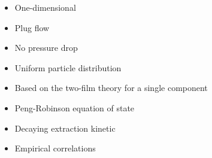 \documentclass[a0,portrait]{a0poster}
\begin{document}
\begin{multicols}{2}
\begin{tcolorbox}[width=\linewidth, boxrule=0mm, sharp corners=all, colback=white]
\begin{minipage}[b]{0.45\linewidth}
	\begin{itemize}
		\item One-dimensional
		\item Plug flow
		\item No pressure drop
		\item Uniform particle distribution
	\end{itemize}
\end{minipage}
\hfill
\begin{minipage}[b]{0.45\linewidth}
	\begin{itemize}
		\item Based on the two-film theory for a single component
		\item Peng-Robinson equation of state
		\item Decaying extraction kinetic
		\item Empirical correlations
	\end{itemize}
\end{minipage}




\end{tcolorbox}
\end{multicols}
\end{document}
